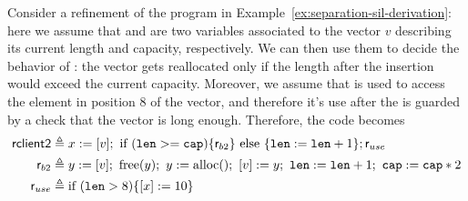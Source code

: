\begin{example}\label{ex:sil:separation-sil-derivation-error}
	Consider a refinement of the program in Example~\ref{ex:separation-sil-derivation}: here we assume that  and  are two variables associated to the vector $v$ describing its current length and capacity, respectively. We can then use them to decide the behavior of : the vector gets reallocated only if the length after the insertion would exceed the current capacity. Moreover, we assume that  is used to access the element in position $8$ of the vector, and therefore it's use after the  is guarded by a check that the vector is long enough.
	Therefore, the code becomes
	\begin{align*}
		\mathsf{rclient2} & \triangleq x := [v];\ \text{if } (\texttt{len} >= \texttt{cap}) \{ \mathsf{r}_{b2} \} \text{ else } \{ \texttt{len} := \texttt{len} + 1 \}; \mathsf{r}_{use} \\
		\mathsf{r}_{b2}        & \triangleq y := [v];\ \text{free}(y);\ y := \text{alloc}();\ [v] := y;\ \texttt{len} := \texttt{len} + 1;\ \texttt{cap} := \texttt{cap} * 2        \\
		\mathsf{r}_{use}       & \triangleq \text{if } (\texttt{len} > 8) \{ [x] := 10 \}
	\end{align*}


\end{example}
